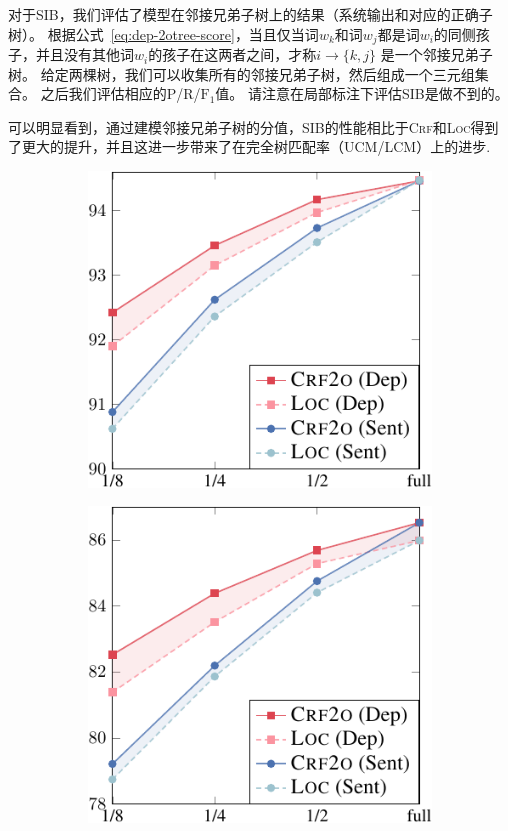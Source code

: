 对于SIB，我们评估了模型在邻接兄弟子树上的结果（系统输出和对应的正确子树）。
根据公式~\ref{eq:dep-2otree-score}，当且仅当词$w_k$和词$w_j$都是词$w_i$的同侧孩子，并且没有其他词$w_i$的孩子在这两者之间，才称$i\rightarrow \{k,j\}$ 是一个邻接兄弟子树。
给定两棵树，我们可以收集所有的邻接兄弟子树，然后组成一个三元组集合。
之后我们评估相应的P/R/$\mathrm{F}_1$值。
请注意在局部标注下评估SIB是做不到的。

可以明显看到，通过建模邻接兄弟子树的分值，SIB的性能相比于\textsc{Crf}和\textsc{Loc}得到了更大的提升，并且这进一步带来了在完全树匹配率（UCM/LCM）上的进步.

\begin{figure}[tb!]
	\centering
	\begin{subfigure}[b]{0.4\textwidth}
		\centering
		\includegraphics[width=1.\textwidth]{figures/part-gap-ptb.pdf}
	\end{subfigure}
	\begin{subfigure}[b]{0.4\textwidth}
		\centering
		\includegraphics[width=1.\textwidth]{figures/part-gap-conll.pdf}

\end{subfigure}
\end{figure}
